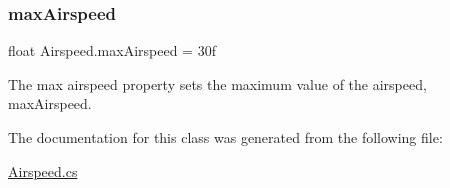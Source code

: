 \subsubsection{\texorpdfstring{max\+Airspeed}{maxAirspeed}}
{\footnotesize\ttfamily float Airspeed.\+max\+Airspeed = 30f}





The max airspeed property sets the maximum value of the airspeed, max\+Airspeed. 

The documentation for this class was generated from the following file\+:\begin{DoxyCompactItemize}
\item 
\hyperlink{_airspeed_8cs}{Airspeed.\+cs}\end{DoxyCompactItemize}
